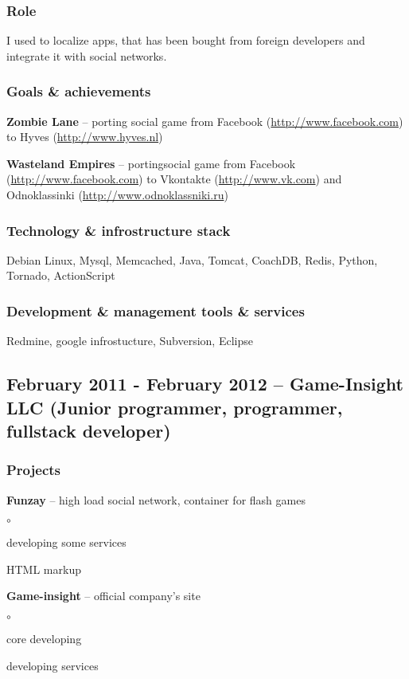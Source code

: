 \documentclass[9pt, a4paper, english]{extarticle}
\begin{document}
    \subsubsection* {Role}
      I used to localize apps, that has been bought from foreign developers and
      integrate it with social networks.
    \subsubsection* {Goals \& achievements}
      \begin {list}{\textbullet}{\itemsep=0mm}
        \item \textbf{Zombie Lane} -- porting social game from Facebook
          (\url{http://www.facebook.com}) to Hyves (\url{http://www.hyves.nl})
        \item \textbf{Wasteland Empires} -- portingsocial game from Facebook
          (\url{http://www.facebook.com}) to Vkontakte
          (\url{http://www.vk.com}) and Odnoklassinki
          (\url{http://www.odnoklassniki.ru})
      \end {list}
    \subsubsection* {Technology \& infrostructure stack}
      Debian Linux, Mysql, Memcached, Java, Tomcat, CoachDB, Redis, Python,
      Tornado, ActionScript
    \subsubsection* {Development \& management tools \& services}
      Redmine, google infrostucture, Subversion, Eclipse


  \subsection* {February 2011 - February 2012 -- \textbf{Game-Insight LLC} (Junior programmer, programmer, fullstack developer)}
    \subsubsection* {Projects}
      \begin {list}{\textbullet}{\itemsep=0mm}
        \item \textbf{Funzay} -- high load social network, container for flash games
          \begin {list}{$\circ$}{}
            \item developing some services
            \item HTML markup 
          \end {list} 
        \item \textbf{Game-insight} -- official company's site
          \begin {list}{$\circ$}{}
            \item core developing
            \item developing services
          \end {list}
      \end {list}
\end{document}
